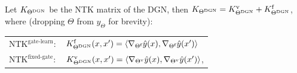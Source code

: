 \begin{proposition}\label{prop:ntks} Let $K_{\Theta^{\text{DGN}}}$ be the NTK matrix of the DGN, then $K_{\Theta^{\text{DGN}}}=K^{\text{v}}_{\Theta^{\text{DGN}}}+K^{\text{f}}_{\Theta^{\text{DGN}}}$, where (dropping $\Theta$ from $\hat{y}_{\Theta}$ for brevity):

\begin{tabular}{p{1.5cm}p{6cm}}%
$\text{NTK}^{\text{gate-learn}}:$ & $K^{\text{f}}_{\Theta^{\text{DGN}}}(x,x')=\langle  \nabla_{\Theta^{\textrm{f}}}\hat{y}(x), \nabla_{\Theta^{\textrm{f}}}\hat{y}(x') \rangle$\\%
$\text{NTK}^{\text{fixed-gate}}:$ & $K^{\text{v}}_{\Theta^{\text{DGN}}}(x,x')=\langle  \nabla_{{\Theta}^{\text{v}}}\hat{y}(x), \nabla_{{\Theta}^{\text{v}}}\hat{y}(x') \rangle$,\\%
\end{tabular}

\end{proposition}
